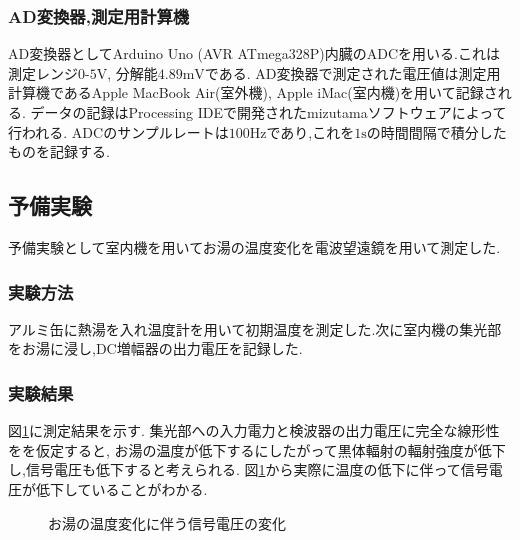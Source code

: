 \subsubsection{AD変換器,測定用計算機}
AD変換器としてArduino Uno (AVR ATmega328P)内臓のADCを用いる.これは測定レンジ$0$-$5\si{\volt}$, 分解能$4.89\si{\milli\volt}$である.
AD変換器で測定された電圧値は測定用計算機であるApple MacBook Air(室外機), Apple iMac(室内機)を用いて記録される.
データの記録はProcessing IDEで開発されたmizutamaソフトウェアによって行われる.
ADCのサンプルレートは$100\si{\hertz}$であり,これを$1\si{\second}$の時間間隔で積分したものを記録する.
\subsection{予備実験}
予備実験として室内機を用いてお湯の温度変化を電波望遠鏡を用いて測定した.
\subsubsection{実験方法}
アルミ缶に熱湯を入れ温度計を用いて初期温度を測定した.次に室内機の集光部をお湯に浸し,DC増幅器の出力電圧を記録した.
\subsubsection{実験結果}
図\ref{fig:hot_water}に測定結果を示す.
集光部への入力電力と検波器の出力電圧に完全な線形性をを仮定すると,
お湯の温度が低下するにしたがって黒体輻射の輻射強度が低下し,信号電圧も低下すると考えられる.
図\ref{fig:hot_water}から実際に温度の低下に伴って信号電圧が低下していることがわかる.
\begin{figure}[hptb]
\begin{center}

\caption{お湯の温度変化に伴う信号電圧の変化}
\label{fig:hot_water}
\end{center}
\end{figure}